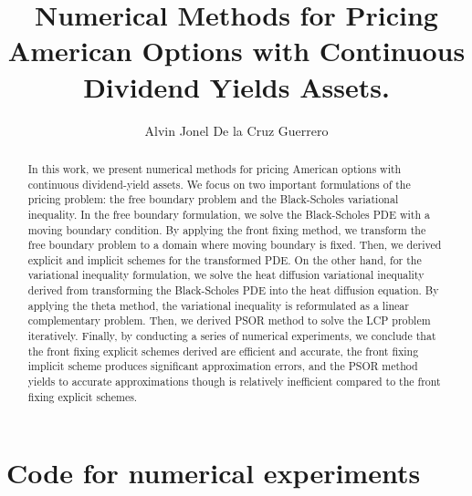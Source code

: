 \documentclass{uonmathreport}
\title{Numerical Methods for Pricing American Options with Continuous Dividend Yields Assets.}
\author{Alvin Jonel De la Cruz Guerrero}
\begin{document}
\maketitle

\begin{abstract}

  In this work, we present numerical methods for pricing American options with continuous dividend-yield assets. We focus on two important formulations of the pricing problem: the free boundary problem and the Black-Scholes variational inequality. In the free boundary formulation, we solve the Black-Scholes PDE with a moving boundary condition. By applying the front fixing method, we transform the free boundary problem to a domain where moving boundary is fixed. Then, we derived explicit and implicit schemes for the transformed PDE. On the other hand, for the variational inequality formulation, we solve the heat diffusion variational inequality derived from transforming the Black-Scholes PDE into the heat diffusion equation. By applying the theta method, the variational inequality is reformulated as a linear complementary problem. Then, we derived PSOR method to solve the LCP problem iteratively. Finally, by conducting a series of numerical experiments, we conclude that the front fixing explicit schemes derived are efficient and accurate, the front fixing implicit scheme produces significant approximation errors, and the PSOR method yields to accurate approximations though is relatively inefficient compared to the front fixing explicit schemes.
  
\end{abstract}

\setcounter{tocdepth}{3}  %
\tableofcontents 
\newpage
{}




% 


% 
\newpage

\appendix


\section{Code for numerical experiments} \label{sec:numericalexperiments}
\end{document}
